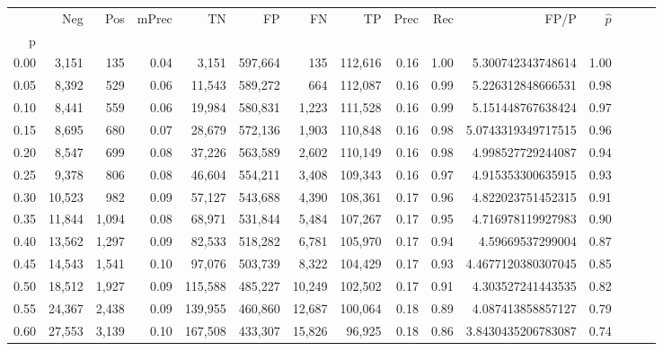 \begin{tabular}{rrrrrrrrrrrrrrr}
\toprule
{} &     Neg &     Pos & mPrec &       TN &       FP &       FN &       TP &  Prec &   Rec &                 FP/P & $\hat{p}$ \\
p    &         &         &       &          &          &          &          &       &       &                      &           \\
\midrule
0.00 &   3,151 &     135 &  0.04 &    3,151 &  597,664 &      135 &  112,616 &  0.16 &  1.00 &    5.300742343748614 &      1.00 \\
0.05 &   8,392 &     529 &  0.06 &   11,543 &  589,272 &      664 &  112,087 &  0.16 &  0.99 &    5.226312848666531 &      0.98 \\
0.10 &   8,441 &     559 &  0.06 &   19,984 &  580,831 &    1,223 &  111,528 &  0.16 &  0.99 &    5.151448767638424 &      0.97 \\
0.15 &   8,695 &     680 &  0.07 &   28,679 &  572,136 &    1,903 &  110,848 &  0.16 &  0.98 &   5.0743319349717515 &      0.96 \\
0.20 &   8,547 &     699 &  0.08 &   37,226 &  563,589 &    2,602 &  110,149 &  0.16 &  0.98 &    4.998527729244087 &      0.94 \\
0.25 &   9,378 &     806 &  0.08 &   46,604 &  554,211 &    3,408 &  109,343 &  0.16 &  0.97 &    4.915353300635915 &      0.93 \\
0.30 &  10,523 &     982 &  0.09 &   57,127 &  543,688 &    4,390 &  108,361 &  0.17 &  0.96 &    4.822023751452315 &      0.91 \\
0.35 &  11,844 &   1,094 &  0.08 &   68,971 &  531,844 &    5,484 &  107,267 &  0.17 &  0.95 &    4.716978119927983 &      0.90 \\
0.40 &  13,562 &   1,297 &  0.09 &   82,533 &  518,282 &    6,781 &  105,970 &  0.17 &  0.94 &     4.59669537299004 &      0.87 \\
0.45 &  14,543 &   1,541 &  0.10 &   97,076 &  503,739 &    8,322 &  104,429 &  0.17 &  0.93 &   4.4677120380307045 &      0.85 \\
0.50 &  18,512 &   1,927 &  0.09 &  115,588 &  485,227 &   10,249 &  102,502 &  0.17 &  0.91 &    4.303527241443535 &      0.82 \\
0.55 &  24,367 &   2,438 &  0.09 &  139,955 &  460,860 &   12,687 &  100,064 &  0.18 &  0.89 &    4.087413858857127 &      0.79 \\
0.60 &  27,553 &   3,139 &  0.10 &  167,508 &  433,307 &   15,826 &   96,925 &  0.18 &  0.86 &   3.8430435206783087 &      0.74 \\

\end{tabular}

